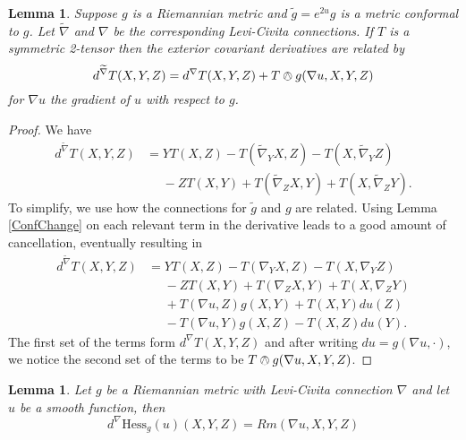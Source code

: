 \documentclass{amsart}
\newtheorem{lem}[thm]{Lemma}
\numberwithin{equation}{section}
\begin{document}
\begin{lem}
\label{dRel}
Suppose $g$ is a Riemannian metric and $\tilde{g} = e^{2u}g$ is a metric conformal to $g$. Let $\widetilde{\nabla}$ and $\nabla$ be the corresponding Levi-Civita connections. 
If $T$ is a symmetric 2-tensor then the exterior covariant derivatives are related by 
\[
d^{\widetilde{\nabla}} T(X,Y,Z) = d^\nabla T(X,Y,Z) + T \owedge g (\nabla u ,X,Y,Z)
\]
for $\nabla u$ the gradient of $u$ with respect to $g$.
\end{lem}
\begin{proof}
We have
\begin{align*}
d^{\widetilde{\nabla}}T(X,Y,Z)
&= YT(X,Z) - T(\widetilde{\nabla}_YX,Z) - T(X, \widetilde{\nabla}_YZ) \\
&\phantom{=} - ZT(X,Y) + T(\widetilde{\nabla}_ZX,Y) + T(X,\widetilde{\nabla}_ZY).
\end{align*}
To simplify, we use how the connections for $\tilde{g}$ and $g$ are related.
Using Lemma \ref{ConfChange} on each relevant term in the derivative leads to a good amount of cancellation, eventually resulting in 
\begin{align*}
d^{\widetilde{\nabla}}T(X,Y,Z)
&=YT(X,Z) - T(\nabla_YX,Z) - T(X, \nabla_YZ) \\
&\phantom{=} - ZT(X,Y) + T(\nabla_ZX,Y) + T(X,\nabla_ZY) \\
&\phantom{=} + T(\nabla u ,Z)g(X,Y) + T(X,Y)du(Z) \\
&\phantom{=} - T(\nabla u, Y)g(X,Z) - T(X,Z)du(Y).
\end{align*}
The first set of the terms form $d^\nabla T(X,Y,Z)$ and after writing $du = g(\nabla u , \cdot)$, we notice the second set of the terms to be $T\owedge g(\nabla u ,X,Y,Z)$.
\end{proof}

\begin{lem}
\label{Hess}
Let $g$ be a Riemannian metric with Levi-Civita connection $\nabla$ and let $u$ be a smooth function, then
\[
d^\nabla \mathrm{Hess}_g(u) (X,Y,Z) = Rm(\nabla u, X, Y, Z)
\]
\end{lem}
\end{document}
